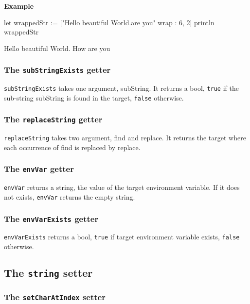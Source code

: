 \documentclass[10pt,openright,twosides,final]{memoir}
\newcommand{\gtlarg}[1]{{\footnotesize\ttfamily\colorbox{light-blue}{#1}}}
\newcommand{\gtlinline}[1]{\colorbox{light-blue}{\lstinline[language=gtl]{#1}}}
\newcommand{\example}{\vspace{.75em}\noindent\textbf{Example}\vspace{0em}}
\begin{document}
\example
\begin{gtl}
let wrappedStr := ["Hello beautiful World.\nHow are you" wrap : 6, 2]
println wrappedStr
\end{gtl}
\begin{console}
Hello 
  beautiful 
  World. 
How 
  are 
  you 
\end{console}

\subsubsection{The \texttt{subStringExists} getter}

\gtlinline{subStringExists} takes one argument, \gtlarg{subString}. It returns a bool, \gtlinline{true} if the sub-string \gtlarg{subString} is found in the target, \gtlinline{false} otherwise.

\subsubsection{The \texttt{replaceString} getter}

\gtlinline{replaceString} takes two argument, \gtlarg{find} and \gtlarg{replace}. It returns the target where each occurrence of \gtlarg{find} is replaced by \gtlarg{replace}.

\subsubsection{The \texttt{envVar} getter}

\gtlinline{envVar} returns a string, the value of the target environment variable. If it does not exists, \gtlinline{envVar} returns the empty string.

\subsubsection{The \texttt{envVarExists} getter}

\gtlinline{envVarExists} returns a bool, \gtlinline{true} if target environment variable exists, \gtlinline{false} otherwise.

\subsection{The \texttt{string} setter}

\subsubsection{The \texttt{setCharAtIndex} setter}
\end{document}
